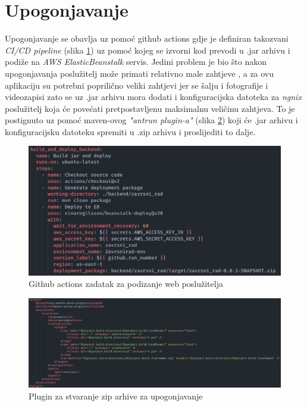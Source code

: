 \documentclass[times, utf8, zavrsni]{fer}
\begin{document}
\section{Upogonjavanje}
Upogonjavanje se obavlja uz pomoć github actions gdje je definiran takozvani \textit{CI/CD pipeline}
(slika \ref{fig:Backend cicd}) uz pomoć kojeg se izvorni kod prevodi u .jar arhivu i podiže na \textit{AWS ElasticBeanstalk} servis.
Jedini problem je bio što nakon upogonjavanja poslužitelj može primati relativno male zahtjeve
, a za ovu aplikaciju su potrebni poprilično veliki zahtjevi jer se šalju i fotografije i videozapisi
zato se uz .jar arhivu mora dodati i konfiguracijska datoteka za \textit{ngnix} poslužitelj koja će povećati
pretpostavljenu maksimalnu veličinu zahtjeva. To je postignuto uz pomoć maven-ovog \textit{"antrun plugin-a"}
(slika \ref{fig:antrun}) koji će .jar arhivu i konfiguracijsku datoteku spremiti u .zip arhivu i proslijediti to dalje.
\begin{figure}[h]
      \centering
      \includegraphics[width=.5\textwidth]{backend_cicd.png}
      \caption{Github actions zadatak za podizanje web poslužitelja}
      \label{fig:Backend cicd}
\end{figure}
\begin{figure}[h]
      \centering
      \includegraphics[width=\textwidth]{antrun.png}
      \caption{Plugin za stvaranje zip arhive za upogonjavanje}
      \label{fig:antrun}
\end{figure}
\end{document}
